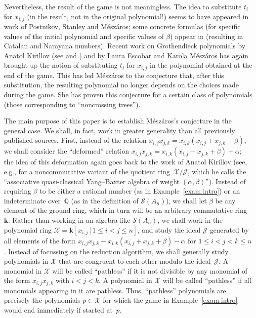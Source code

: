 \documentclass[pdftex]{sigma}
\numberwithin{equation}{section}
\begin{document}
Nevertheless, the result of the game is not meaningless. The idea to substitute $t_{i}$ for $x_{i,j}$ (in the result, not in the original polynomial!) seems to have appeared in work of Postnikov, Stanley and M\'{e}sz\'{a}ros; some concrete formulas (for specific values of the initial polynomial and specific values of $\beta$) appear in \cite[Exercise~A22]{Stanle15} (resulting in Catalan and Narayana numbers). Recent work on Grothendieck polynomials by Anatol Kirillov (see \cite[Section~4]{Kirill13} and \cite{Kirill16}) and by Laura Escobar and Karola M\'{e}sz\'{a}ros \cite[Section~5]{EscMes15} has again brought up the notion of substituting $t_{i}$ for $x_{i,j}$ in the polynomial obtained at the end of the game. This has led M\'{e}sz\'{a}ros to the conjecture that, after this substitution, the resulting polynomial no longer depends on the choices made during the game. She has proven this conjecture for a certain class of polynomials (those corresponding to ``noncrossing trees'').

The main purpose of this paper is to establish M\'{e}sz\'{a}ros's conjecture in the general case. We shall, in fact, work in greater generality than all previously published sources. First, instead of the relation $x_{i,j}x_{j,k}=x_{i,k} ( x_{i,j}+x_{j,k}+\beta ) $, we shall consider the ``deformed'' relation $x_{i,j}x_{j,k}=x_{i,k} ( x_{i,j}+x_{j,k}+\beta ) +\alpha$; the idea of this deformation again goes back to the work of Anatol Kirillov (see, e.g., \cite[Definition~5.1(1)]{Kirill16} for a noncommutative variant of the quotient ring~$\mathcal{X}/\mathcal{J}$, which he calls the ``associative quasi-classical Yang--Baxter algebra of weight $(\alpha,\beta)$''). Instead of requiring $\beta$ to be either a rational number (as in Example~\ref{exam.intro}) or an indeterminate over~$\mathbb{Q}$ (as in the definition of $\mathcal{S}(A_{n})$), we shall let $\beta$ be any element of the ground ring, which in turn will be an arbitrary commutative ring~$\mathbf{k}$. Rather than working in an algebra like $\mathcal{S}(A_{n}) $, we shall work in the polynomial ring $\mathcal{X}=\mathbf{k}[ x_{i,j}\,|\, 1\leq i<j\leq n] $, and study the ideal $\mathcal{J}$ generated by all elements of the form $x_{i,j}x_{j,k}-x_{i,k} ( x_{i,j}+x_{j,k}+\beta ) -\alpha$ for $1\leq i<j<k\leq n$. Instead of focussing on the reduction algorithm, we shall generally study polynomials in $\mathcal{X}$ that are congruent to each other modulo the ideal~$\mathcal{J}$. A monomial in $\mathcal{X}$ will be called ``pathless'' if it is not divisible by
any monomial of the form $x_{i,j}x_{j,k}$ with $i<j<k$. A polynomial in $\mathcal{X}$ will be called ``pathless'' if all monomials appearing in it are pathless. Thus, ``pathless'' polynomials are precisely the polynomials
$p\in\mathcal{X}$ for which the game in Example~\ref{exam.intro} would end immediately if started at~$p$.
\end{document}
